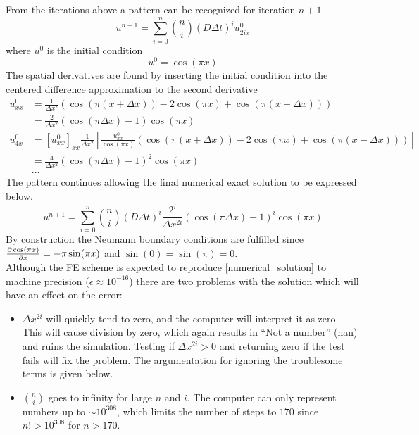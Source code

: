 \noindent From the iterations above a pattern can be recognized for iteration $n+1$\\
\begin{equation}
 u^{n+1} = \sum\limits_{i=0}^n {n\choose i}\left(D\Delta t\right)^iu^0_{2ix}
\end{equation}
where $u^0$ is the initial condition
\begin{equation}
 u^0 = \cos(\pi x)
\end{equation}
The spatial derivatives are found by inserting the initial condition into the centered difference approximation to the second derivative 
\begin{align*}
 u^0_{xx} &= \frac{1}{\Delta x^2}\left(\cos(\pi(x+\Delta x)) -2\cos(\pi x) +\cos(\pi(x-\Delta x))\right) \\
 &= \frac{2}{\Delta x^2}\left(\cos(\pi\Delta x)-1\right)\cos(\pi x)\\
 u^0_{4x} &= [u^0_{xx}]_{xx} \frac{1}{\Delta x^2}\left[\frac{u^0_{xx}}{\cos(\pi x)}\left(\cos(\pi(x+\Delta x)) -2\cos(\pi x) +\cos(\pi(x-\Delta x))\right)\right]\\
 &= \frac{4}{\Delta x^2}\left(\cos(\pi\Delta x)-1\right)^2\cos(\pi x)\\
 &\dots
\end{align*}
The pattern continues allowing the final numerical exact solution to be expressed below.
\begin{equation}\label{numerical_solution}
  u^{n+1} = \sum\limits_{i=0}^n {n\choose i}\left(D\Delta t\right)^i\frac{2^i}{\Delta x^{2i}}\left(\cos(\pi\Delta x)-1\right)^i\cos(\pi x)
\end{equation}
By construction the Neumann boundary conditions are fulfilled since $\frac{\partial \cos(\pi x)}{\partial x} = -\pi\sin(\pi x)$ and $\sin(0) = \sin(\pi) = 0$. \\

Although the FE scheme is expected to reproduce \eqref{numerical_solution} to machine precision ($\epsilon \approx 10^{-16}$) there are two problems with the solution which will have an effect on the error:
\begin{itemize}
 \item $\Delta x^{2i}$ will quickly tend to zero, and the computer will interpret it as zero. This will cause division by zero, which again results in ``Not a number'' (nan) and ruins the simulation. Testing if $\Delta x^{2i}>0$ and returning zero if the test fails will fix the problem. The argumentation for ignoring the troublesome terms is given below.
 \item ${n\choose i}$ goes to infinity for large $n$ and $i$. The computer can only represent numbers up to $\sim10^{308}$, which limits the number of steps to $170$ since $n!>10^{308}$ for $n>170$.
\end{itemize}

